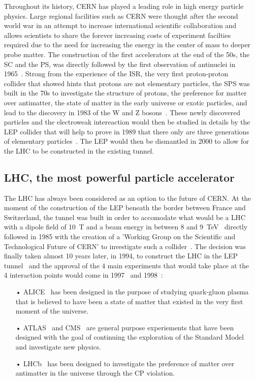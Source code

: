 	Throughout its history, CERN has played a leading role in high energy particle physics. Large regional facilities such as CERN were thought after the second world war in an attempt to increase international scientific collaboration and allows scientists to share the forever increasing costs of experiment facilties required due to the need for increasing the energy in the center of mass to deeper probe matter. The construction of the first accelerators at the end of the 50s, the \acf{SC} and the \acf{PS}, was directly followed by the first observation of antinuclei in 1965~\cite{MASSAM1965}. Strong from the experience of the \acf{ISR}, the very first proton-proton collider that showed hints that protons are not elementary particles, the \acf{SPS} was built in the 70s to investigate the structure of protons, the preference for matter over antimatter, the state of matter in the early universe or exotic particles, and lead to the discovery in 1983 of the W and Z bosons~\cite{UA1W1983,UA2W1983,UA1Z1983,UA2Z1983}. These newly discovered particles and the electroweak intereaction would then be studied in details by the \acf{LEP} collider that will help to prove in 1989 that there only are three generations of elementary particles~\cite{ALEPH1989}. The LEP would then be dismantled in 2000 to allow for the LHC to be constructed in the existing tunnel.

	\subsection{LHC, the most powerful particle accelerator}
	\label{chapt2:ssec:LHC}
	
	The LHC has always been considered as an option to the future of CERN. At the moment of the construction of the LEP beneath the border between France and Switzerland, the tunnel was built in order to accomodate what would be a \acl{LHC} with a dipole field of \SI{10}{T} and a beam energy in between 8 and \SI{9}{TeV}~\cite{ANNUALREPORT1984} directly followed in 1985 with the creation of a 'Working Group on the Scientific and Technological Future of CERN' to investigate such a collider~\cite{ANNUALREPORT1985}. The decision was finally taken almost 10 years later, in 1994, to construct the LHC in the LEP tunnel~\cite{ANNUALREPORT1994} and the approval of the 4 main experiments that would take place at the 4 interaction points would come in 1997~\cite{ANNUALREPORT1997} and 1998~\cite{ANNUALREPORT1998}:
	
	\begin{itemize}
		\item[•] ALICE~\cite{ALICELOI} has been designed in the purpose of studying quark-gluon plasma that is believed to have been a state of matter that existed in the very first moment of the universe.
		\item[•] ATLAS~\cite{ATLASLOI} and CMS~\cite{CMSLOI} are general purpose experiements that have been designed with the goal of continuing the exploration of the Standard Model and investigate new physics.
		\item[•] LHCb~\cite{LHCBLOI} has been designed to investigate the preference of matter over antimatter in the universe through the CP violation.
	\end{itemize}
	
